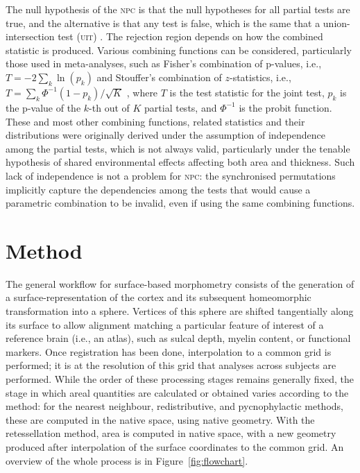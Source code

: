 The null hypothesis of the \textsc{npc} is that the null hypotheses for all partial tests are true, and the alternative is that any test is false, which is the same that a union-intersection test (\textsc{uit}) \citep{Roy1953}. The rejection region depends on how the combined statistic is produced. Various combining functions can be considered, particularly those used in meta-analyses, such as Fisher's combination of p-values, i.e., $T=-2\sum_k\ln(p_k)$ \citep{Fisher1932} and Stouffer's combination of $z$-statistics, i.e., $T = \sum_k \Phi^{-1}(1-p_k)/\sqrt{K}$ \citep{Stouffer1949}, where $T$ is the test statistic for the joint test, $p_k$ is the p-value of the $k$-th out of $K$ partial tests, and $\Phi^{-1}$ is the probit function. These and most other combining functions, related statistics and their distributions were originally derived under the assumption of independence among the partial tests, which is not always valid, particularly under the tenable hypothesis of shared environmental effects affecting both area and thickness. Such lack of independence is not a problem for \textsc{npc}: the synchronised permutations implicitly capture the dependencies among the tests that would cause a parametric combination to be invalid, even if using the same combining functions.

\section{Method}
\label{sec:cortex:method}

The general workflow for surface-based morphometry consists of the generation of a surface-representation of the cortex and its subsequent homeomorphic transformation into a sphere. Vertices of this sphere are shifted tangentially along its surface to allow alignment matching a particular feature of interest of a reference brain (i.e., an atlas), such as sulcal depth, myelin content, or functional markers. Once registration has been done, interpolation to a common grid is performed; it is at the resolution of this grid that analyses across subjects are performed. While the order of these processing stages remains generally fixed, the stage in which areal quantities are calculated or obtained varies according to the method: for the nearest neighbour, redistributive, and pycnophylactic methods, these are computed in the native space, using native geometry. With the retessellation method, area is computed in native space, with a new geometry produced after interpolation of the surface coordinates to the common grid. An overview of the whole process is in Figure~\ref{fig:flowchart}.

